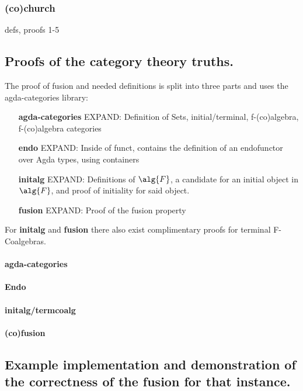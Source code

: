 \subsubsection{(co)church}
defs, proofs 1-5

\subsection{Proofs of the category theory truths.}\label{sec:cat_truths}
The proof of fusion and needed definitions is split into three parts and uses the agda-categories library: %
\begin{itemize}
    \item[\textbf{agda-categories}] EXPAND: Definition of Sets, initial/terminal, f-(co)algebra, f-(co)algebra categories
    \item[\textbf{endo}] EXPAND: Inside of funct, contains the definition of an endofunctor over Agda types, using containers
    \item[\textbf{initalg}] EXPAND: Definitions of $\alg{F}$, a candidate for an initial object in $\alg{F}$, and proof of initiality for said object.
    \item[\textbf{fusion}] EXPAND: Proof of the fusion property
\end{itemize}
For \textbf{initalg} and \textbf{fusion} there also exist complimentary proofs for terminal F-Coalgebras.

\paragraph{agda-categories}
\paragraph{Endo}
\paragraph{initalg/termcoalg}
\paragraph{(co)fusion}


\subsection{Example implementation and demonstration of the correctness of the fusion for that instance.}






\iffalse
Outline:
- Harper's work has some mathematics in it, I formalized it.
- The formalization was done in two parts:
  - The formalization of the mathematics itself
  - The formalization of the mathematics, embedded in categories to leverage the fusion property
- The Formalization also implemented an example datastructure to demonstrate the proof's applicability in practice.
\fi


